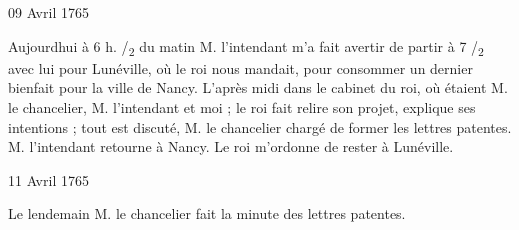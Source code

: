                      \begin{diary}{09 Avril 1765}{}

                         Aujourdhui à 6 h. /\textsubscript{2} du matin M. l'intendant
                           m'a fait avertir de partir à 7 /\textsubscript{2} avec lui
                           pour Lunéville, où le roi nous mandait, pour
                           consommer un dernier bienfait pour la ville
                           de Nancy. L'après midi dans le
                           cabinet
                           du roi, où étaient M. le
                              chancelier, M.
                              l'intendant et moi ; le roi fait relire son projet, explique ses
                           intentions ; tout est
                           discuté, M. le chancelier
                           chargé de former
                           les lettres patentes. M. l'intendant retourne
                           à Nancy. Le roi m'ordonne de rester à Lunéville. \bigskip


                     \end{diary}

                     \begin{diary}{11 Avril 1765}{}

                         Le lendemain M. le chancelier fait la minute
                           des lettres patentes. \bigskip


                     \end{diary}

